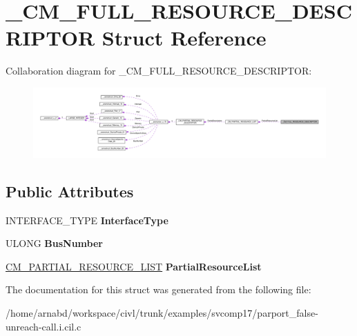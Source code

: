 \hypertarget{struct__CM__FULL__RESOURCE__DESCRIPTOR}{}\section{\+\_\+\+C\+M\+\_\+\+F\+U\+L\+L\+\_\+\+R\+E\+S\+O\+U\+R\+C\+E\+\_\+\+D\+E\+S\+C\+R\+I\+P\+T\+O\+R Struct Reference}
\label{struct__CM__FULL__RESOURCE__DESCRIPTOR}


Collaboration diagram for \+\_\+\+C\+M\+\_\+\+F\+U\+L\+L\+\_\+\+R\+E\+S\+O\+U\+R\+C\+E\+\_\+\+D\+E\+S\+C\+R\+I\+P\+T\+O\+R\+:
\nopagebreak
\begin{figure}[H]
\begin{center}
\leavevmode
\includegraphics[width=350pt]{struct__CM__FULL__RESOURCE__DESCRIPTOR__coll__graph}
\end{center}
\end{figure}
\subsection*{Public Attributes}
\begin{DoxyCompactItemize}
\item 
\hypertarget{struct__CM__FULL__RESOURCE__DESCRIPTOR_a5ae3386856c5454b932d13d24e896cd3}{}I\+N\+T\+E\+R\+F\+A\+C\+E\+\_\+\+T\+Y\+P\+E {\bfseries Interface\+Type}\label{struct__CM__FULL__RESOURCE__DESCRIPTOR_a5ae3386856c5454b932d13d24e896cd3}

\item 
\hypertarget{struct__CM__FULL__RESOURCE__DESCRIPTOR_acf9841d5ea3220cb5159365a1f4d6f84}{}U\+L\+O\+N\+G {\bfseries Bus\+Number}\label{struct__CM__FULL__RESOURCE__DESCRIPTOR_acf9841d5ea3220cb5159365a1f4d6f84}

\item 
\hypertarget{struct__CM__FULL__RESOURCE__DESCRIPTOR_a1ad7981f02548aa1992309a9c862d396}{}\hyperlink{struct__CM__PARTIAL__RESOURCE__LIST}{C\+M\+\_\+\+P\+A\+R\+T\+I\+A\+L\+\_\+\+R\+E\+S\+O\+U\+R\+C\+E\+\_\+\+L\+I\+S\+T} {\bfseries Partial\+Resource\+List}\label{struct__CM__FULL__RESOURCE__DESCRIPTOR_a1ad7981f02548aa1992309a9c862d396}

\end{DoxyCompactItemize}


The documentation for this struct was generated from the following file\+:\begin{DoxyCompactItemize}
\item 
/home/arnabd/workspace/civl/trunk/examples/svcomp17/parport\+\_\+false-\/unreach-\/call.\+i.\+cil.\+c\end{DoxyCompactItemize}
